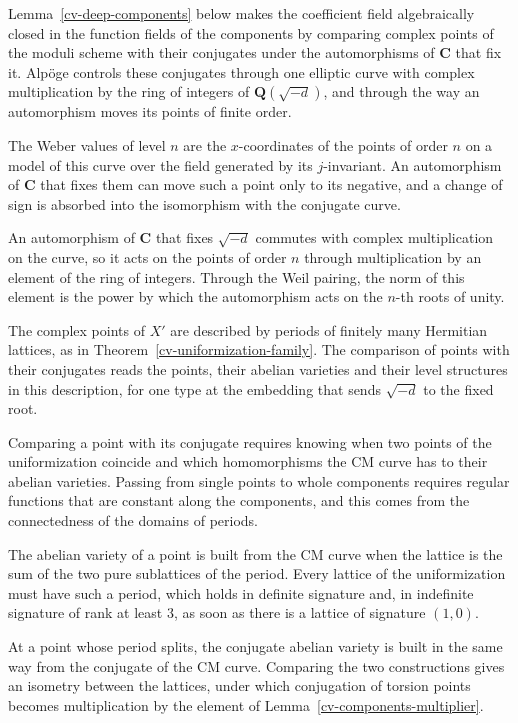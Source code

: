 Lemma~\ref{cv-deep-components} below makes the coefficient field algebraically closed in the function
fields of the components by comparing complex points of the moduli scheme with their conjugates under
the automorphisms of $\mathbf C$ that fix it. Alp\"oge controls these conjugates through one elliptic
curve with complex multiplication by the ring of integers of $\mathbf Q(\sqrt{-d})$, and through the way
an automorphism moves its points of finite order.

The Weber values of level $n$ are the $x$-coordinates of the points of order $n$ on a model of this
curve over the field generated by its $j$-invariant. An automorphism of $\mathbf C$ that fixes them can
move such a point only to its negative, and a change of sign is absorbed into the isomorphism with the
conjugate curve.

An automorphism of $\mathbf C$ that fixes $\sqrt{-d}$ commutes with complex multiplication on the curve,
so it acts on the points of order $n$ through multiplication by an element of the ring of integers.
Through the Weil pairing, the norm of this element is the power by which the automorphism acts on the
$n$-th roots of unity.

The complex points of $X'$ are described by periods of finitely many Hermitian lattices, as in
Theorem~\ref{cv-uniformization-family}. The comparison of points with their conjugates reads the points,
their abelian varieties and their level structures in this description, for one type at the embedding
that sends $\sqrt{-d}$ to the fixed root.

Comparing a point with its conjugate requires knowing when two points of the uniformization coincide and
which homomorphisms the CM curve has to their abelian varieties. Passing from single points to whole
components requires regular functions that are constant along the components, and this comes from the
connectedness of the domains of periods.

The abelian variety of a point is built from the CM curve when the lattice is the sum of the two pure
sublattices of the period. Every lattice of the uniformization must have such a period, which holds in
definite signature and, in indefinite signature of rank at least $3$, as soon as there is a lattice of
signature $(1,0)$.

At a point whose period splits, the conjugate abelian variety is built in the same way from the
conjugate of the CM curve. Comparing the two constructions gives an isometry between the lattices,
under which conjugation of torsion points becomes multiplication by the element of
Lemma~\ref{cv-components-multiplier}.


